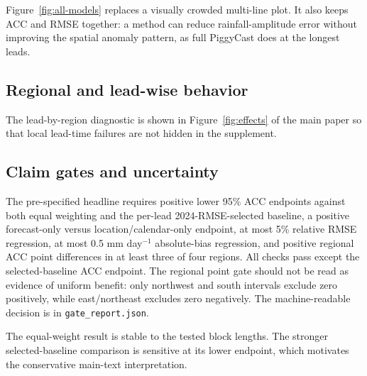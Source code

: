 Figure~\ref{fig:all-models} replaces a visually crowded multi-line plot. It
also keeps ACC and RMSE together: a method can reduce rainfall-amplitude error
without improving the spatial anomaly pattern, as full PiggyCast does at the
longest leads.

\subsection{Regional and lead-wise behavior}

\begin{table}[h]
\centering\small
\caption{Full PiggyCast minus equal-weight regional ACC, averaged across
initializations and leads.}
\label{tab:regions}
\resizebox{\columnwidth}{!}{}
\end{table}

The lead-by-region diagnostic is shown in Figure~\ref{fig:effects} of the main
paper so that local lead-time failures are not hidden in the supplement.

\subsection{Claim gates and uncertainty}

The pre-specified headline requires positive lower 95\% ACC endpoints against
both equal weighting and the per-lead 2024-RMSE-selected baseline, a positive
forecast-only versus location/calendar-only endpoint, at most 5\% relative
RMSE regression, at most 0.5 mm day$^{-1}$ absolute-bias regression, and
positive regional ACC point differences in at least three of four regions.
All checks pass except the selected-baseline ACC endpoint. The regional point
gate should not be read as evidence of uniform benefit: only northwest and
south intervals exclude zero positively, while east/northeast excludes zero
negatively. The machine-readable decision is in
\texttt{gate\_report.json}.

\begin{table}[h]
\centering\small
\caption{95\% paired ACC intervals under alternative moving-block lengths.
Point effects are 0.040 (full minus equal) and 0.052 (full minus per-lead
selected) at every length.}
\label{tab:bootstrap}
\resizebox{\columnwidth}{!}{}
\end{table}

The equal-weight result is stable to the tested block lengths. The stronger
selected-baseline comparison is sensitive at its lower endpoint, which
motivates the conservative main-text interpretation.

